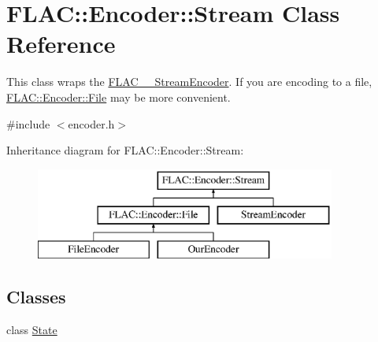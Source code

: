 \hypertarget{class_f_l_a_c_1_1_encoder_1_1_stream}{}\section{F\+L\+AC\+:\+:Encoder\+:\+:Stream Class Reference}
\label{class_f_l_a_c_1_1_encoder_1_1_stream}


This class wraps the \hyperlink{struct_f_l_a_c_____stream_encoder}{F\+L\+A\+C\+\_\+\+\_\+\+Stream\+Encoder}. If you are encoding to a file, \hyperlink{class_f_l_a_c_1_1_encoder_1_1_file}{F\+L\+A\+C\+::\+Encoder\+::\+File} may be more convenient.  




{\ttfamily \#include $<$encoder.\+h$>$}

Inheritance diagram for F\+L\+AC\+:\+:Encoder\+:\+:Stream\+:\begin{figure}[H]
\begin{center}
\leavevmode
\includegraphics[height=3.000000cm]{class_f_l_a_c_1_1_encoder_1_1_stream}
\end{center}
\end{figure}
\subsection*{Classes}
\begin{DoxyCompactItemize}
\item 
class \hyperlink{class_f_l_a_c_1_1_encoder_1_1_stream_1_1_state}{State}
\end{DoxyCompactItemize}

